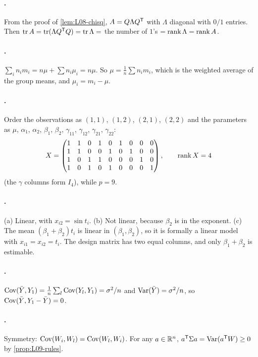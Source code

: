 \paragraph{.}
From the proof of \cref{lem:L08-chisq}, $A=Q\Lambda Q^{\mathsf T}$ with $\Lambda$ diagonal with $0/1$ entries.
Then $\operatorname{tr} A=\operatorname{tr}(\Lambda Q^{\mathsf T} Q)=\operatorname{tr}\Lambda=$ the number of $1$'s $=\operatorname{rank}\Lambda=\operatorname{rank} A$.

\paragraph{.}
$\sum_i n_im_i=n\mu+\sum n_i\mu_i=n\mu$. So $\mu=\frac1n\sum n_im_i$, which is the weighted average of
the group means, and $\mu_i=m_i-\mu$.

\paragraph{.}
Order the observations as $(1,1)$, $(1,2)$, $(2,1)$, $(2,2)$ and the parameters as
$\mu$, $\alpha_1$, $\alpha_2$, $\beta_1$, $\beta_2$, $\gamma_{11}$, $\gamma_{12}$, $\gamma_{21}$, $\gamma_{22}$:
\[
X=\begin{pmatrix}
1&1&0&1&0&1&0&0&0\\
1&1&0&0&1&0&1&0&0\\
1&0&1&1&0&0&0&1&0\\
1&0&1&0&1&0&0&0&1
\end{pmatrix},\qquad \operatorname{rank} X=4
\]
(the $\gamma$ columns form $I_4$), while $p=9$.

\paragraph{.}
(a) Linear, with $x_{i2}=\sin t_i$. (b) Not linear, because $\beta_2$ is in the exponent.
(c) The mean $(\beta_1+\beta_2)t_i$ is linear in $(\beta_1,\beta_2)$, so it is formally a linear model with
$x_{i1}=x_{i2}=t_i$. The design matrix has two equal columns, and only $\beta_1+\beta_2$ is estimable.

\paragraph{.}
$\operatorname{Cov}(\bar Y,Y_1)=\frac1n\sum_l\operatorname{Cov}(Y_l,Y_1)=\sigma^2/n$ and $\operatorname{Var}(\bar Y)=\sigma^2/n$, so
$\operatorname{Cov}(\bar Y,Y_1-\bar Y)=0$.

\paragraph{.}
Symmetry: $\operatorname{Cov}(W_i,W_l)=\operatorname{Cov}(W_l,W_i)$. For any $a\in\mathbb R^n$,
$a^{\mathsf T}\Sigma a=\operatorname{Var}(a^{\mathsf T} W)\ge 0$ by \cref{prop:L09-rules}.

